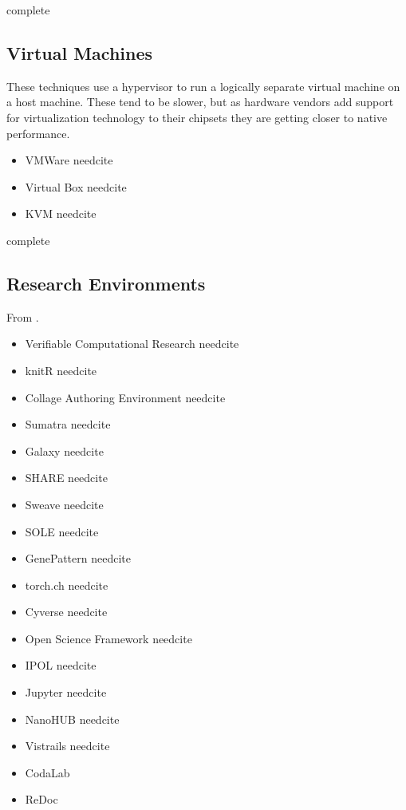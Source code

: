 \documentclass[american]{article}
\newcommand{\complete}{
	\gls{complete}
}
\newcommand{\needcite}{
	\gls{needcite}
}
\begin{document}
\complete

\subsection{Virtual Machines} \label{sec:software-virtual}

These techniques use a hypervisor to run a logically separate virtual machine on a host machine. These tend to be slower, but as hardware vendors add support for virtualization technology to their chipsets they are getting closer to native performance.

\begin{itemize}
\item VMWare \needcite
\item Virtual Box \needcite
\item KVM \needcite
\end{itemize}

\complete

\subsection{Research Environments} \label{sec:software-environments}

From \cite{stodden-sharing-reproducibility-talk-2017}.

\begin{itemize}
\item Verifiable Computational Research \needcite
\item knitR \needcite
\item Collage Authoring Environment \needcite
\item Sumatra \needcite
\item Galaxy \needcite
\item SHARE \needcite
\item Sweave \needcite
\item SOLE \needcite
\item GenePattern \needcite
\item torch.ch \needcite
\item Cyverse \needcite
\item Open Science Framework \needcite
\item IPOL \needcite
\item Jupyter \needcite
\item NanoHUB \needcite
\item Vistrails \needcite
\item CodaLab \cite{codalab}
\item ReDoc \cite{claerbout-make-reproducible-2000}
\end{itemize}
\end{document}

